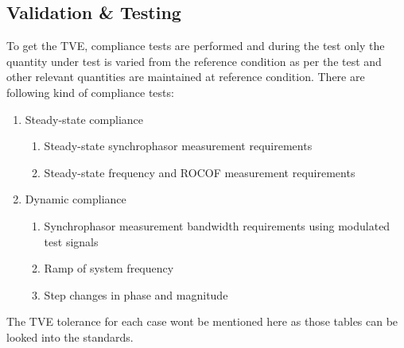 \subsection{Validation \& Testing }
To get the TVE, compliance tests are performed and during the test only the quantity under test is varied from the reference condition as per the test and other relevant quantities are maintained at reference condition. There are following kind of compliance tests:
\begin{enumerate}
\item Steady-state compliance
	\begin{enumerate}
	\item Steady-state synchrophasor measurement requirements
	\item Steady-state frequency and ROCOF measurement requirements
	\end{enumerate}
\item Dynamic compliance
	\begin{enumerate}
	\item Synchrophasor measurement bandwidth requirements using modulated test signals
	\item Ramp of system frequency
	\item Step changes in phase and magnitude
	\end{enumerate}
\end{enumerate} 
The TVE tolerance for each case wont be mentioned here as those tables can be looked into the standards.


